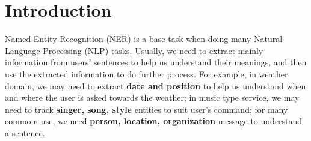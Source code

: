 \documentclass[letterpaper]{article} %
\begin{document}
%
%
%

\section{Introduction}
Named Entity Recognition (NER) is a base task when doing many Natural Language Processing (NLP) tasks. Usually, we need to extract mainly information from users' sentences to help us understand their meanings, and then use the extracted information to do further process. For example, in weather domain, we may need to extract \textbf{date and position} to help us understand when and where the user is asked towards the weather; in music type service, we may need to track \textbf{singer, song, style } entities to suit user's command; for many commom use, we need \textbf{person, location, organization} message to understand a sentence.
\end{document}
